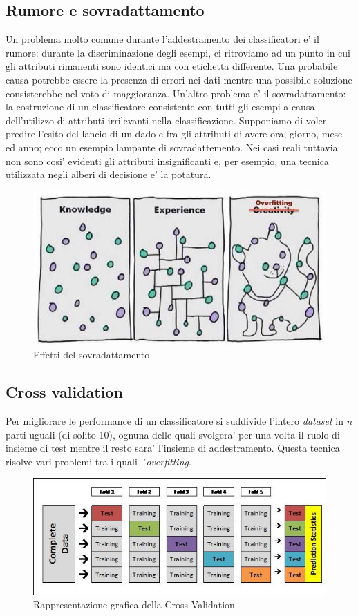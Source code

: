 \subsection{Rumore e sovradattamento}
Un problema molto comune durante l'addestramento dei classificatori e' il rumore: durante la discriminazione degli esempi, ci ritroviamo ad un punto in cui gli attributi rimanenti sono identici ma con etichetta differente. Una probabile causa potrebbe essere la presenza di errori nei dati mentre una possibile soluzione consisterebbe nel voto di maggioranza.
Un'altro problema e' il sovradattamento: la costruzione di un classificatore consistente con tutti gli esempi a causa dell'utilizzo di attributi irrilevanti nella classificazione. Supponiamo di voler predire l'esito del lancio di un dado e fra gli attributi di avere ora, giorno, mese ed anno; ecco un esempio lampante di sovradattemento. Nei casi reali tuttavia non sono cosi' evidenti gli attributi insignificanti e, per esempio, una tecnica utilizzata  negli alberi di decisione e' la potatura.

\begin{figure}[H]
	\centering
	\includegraphics[width=0.7\linewidth]{img/overfitting}
	\caption{Effetti del sovradattamento}
	\label{fig:overfitting}
\end{figure}


\subsection{Cross validation}
Per migliorare le performance di un classificatore si suddivide l'intero \textit{dataset} in $n$ parti uguali (di solito 10), ognuna delle quali svolgera' per una volta il ruolo di insieme di test mentre il resto sara' l'insieme di addestramento. Questa tecnica risolve vari problemi tra i quali l'\textit{overfitting}.\\

\begin{figure}[H]
	\centering
	\includegraphics[width=0.7\linewidth]{img/crossvalidation}
	\caption{Rappresentazione grafica della Cross Validation}
	\label{fig:crossvalidation}
\end{figure}


